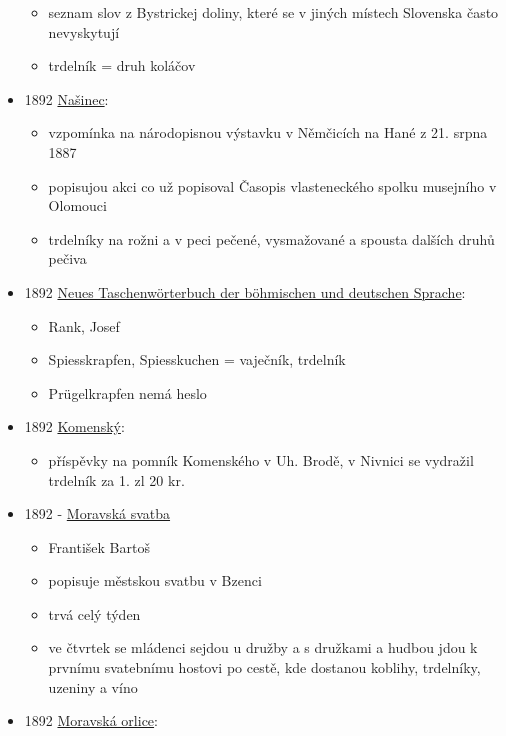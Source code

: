 \begin{itemize}
  \begin{itemize}
  \tightlist
  \item
    seznam slov z Bystrickej doliny, které se v jiných místech Slovenska
    často nevyskytují
  \item
    trdelník = druh koláčov
  \end{itemize}
\item
  1892
  \href{https://ceskadigitalniknihovna.cz/uuid/uuid:852faf14-821a-11e0-b92b-0050569d679d}{Našinec}:

  \begin{itemize}
  \tightlist
  \item
    vzpomínka na národopisnou výstavku v Němčicích na Hané z 21. srpna
    1887
  \item
    popisujou akci co už popisoval Časopis vlasteneckého spolku
    musejního v Olomouci
  \item
    trdelníky na rožni a v peci pečené, vysmažované a spousta dalších
    druhů pečiva
  \end{itemize}
\item
  1892
  \href{https://ceskadigitalniknihovna.cz/uuid/uuid:0869a320-dc1a-11e6-9e7e-001018b5eb5c}{Neues
  Taschenwörterbuch der böhmischen und deutschen Sprache}:

  \begin{itemize}
  \tightlist
  \item
    Rank, Josef
  \item
    Spiesskrapfen, Spiesskuchen = vaječník, trdelník
  \item
    Prügelkrapfen nemá heslo
  \end{itemize}
\item
  1892
  \href{https://www.google.cz/books/edition/Komensk\%C3\%BD/twVGAQAAMAAJ?hl=cs&gbpv=1&dq=trdeln\%C3\%ADk&pg=RA2-PA181&printsec=frontcover}{Komenský}:

  \begin{itemize}
  \tightlist
  \item
    příspěvky na pomník Komenského v Uh. Brodě, v Nivnici se vydražil
    trdelník za 1. zl 20 kr.
  \end{itemize}
\item
  1892 -
  \href{https://ndk.cz/view/uuid:289bb2c0-9f1e-11dc-bf2d-000d606f5dc6?page=uuid\%3Aca676860-e56d-11e7-8cdd-5ef3fc9bb22f&fulltext=trdeln\%C3\%ADky}{Moravská
  svatba}

  \begin{itemize}
  \tightlist
  \item
    František Bartoš
  \item
    popisuje městskou svatbu v Bzenci
  \item
    trvá celý týden
  \item
    ve čtvrtek se mládenci sejdou u družby a s družkami a hudbou jdou k
    prvnímu svatebnímu hostovi po cestě, kde dostanou koblihy,
    trdelníky, uzeniny a víno
  \end{itemize}
\item
  1892
  \href{https://ceskadigitalniknihovna.cz/uuid/uuid:04f469ce-32f0-11de-992b-00145e5790ea}{Moravská
  orlice}:


\end{itemize}
